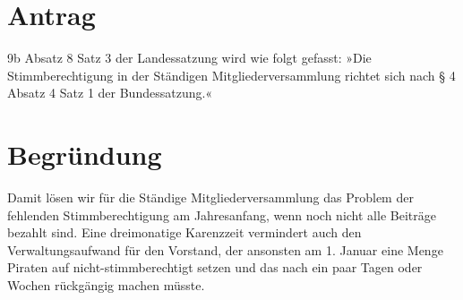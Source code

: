 \section{Antrag}

9b Absatz 8 Satz 3 der Landessatzung wird wie folgt gefasst: »Die Stimmberechtigung in der Ständigen Mitgliederversammlung richtet sich nach § 4 Absatz 4 Satz 1 der Bundessatzung.«

\section{Begründung}

Damit lösen wir für die Ständige Mitgliederversammlung das Problem der fehlenden Stimmberechtigung am Jahresanfang, wenn noch nicht alle Beiträge bezahlt sind. Eine dreimonatige Karenzzeit vermindert auch den Verwaltungsaufwand für den Vorstand, der ansonsten am 1. Januar eine Menge Piraten auf nicht-stimmberechtigt setzen und das nach ein paar Tagen oder Wochen rückgängig machen müsste.

